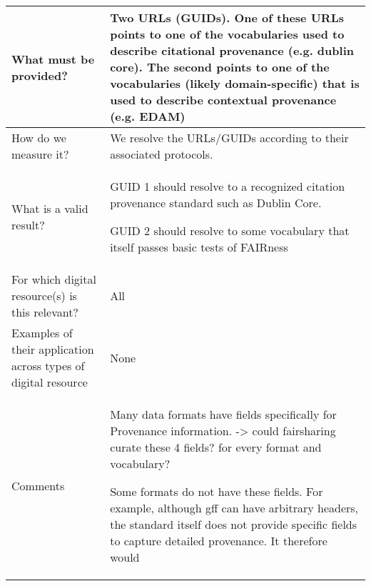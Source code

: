 \documentclass[english]{article}
\begin{document}
\begin{longtable}{|p{5cm}|p{9cm}|}
  
\\



\hline
What must be provided? &  


Two URLs (GUIDs).  One of these URLs points to one of the vocabularies used to describe citational provenance (e.g. dublin core).  The second points to one of the vocabularies (likely domain-specific) that is used to describe contextual provenance (e.g. EDAM)


\\



\hline
How do we measure it? &  


We resolve the URLs/GUIDs according to their associated protocols. 


\\



\hline
What is a valid result? &  


GUID 1 should resolve to a recognized citation provenance standard such as Dublin Core.\newline 

GUID 2 should resolve to some vocabulary that itself passes basic tests of FAIRness\newline


\\



\hline
For which digital resource(s) is this relevant? &  All\\



\hline
Examples of their application across types of digital resource &  None

\\



\hline

Comments & 


Many data formats have fields specifically for Provenance information.  -> could fairsharing curate these 4 fields? for every format and vocabulary? \newline

Some formats do not have these fields.  For example, although gff can have arbitrary headers, the standard itself does not provide specific fields to capture detailed provenance. It therefore would 




\\
\hline

\end{longtable}
\end{document}
